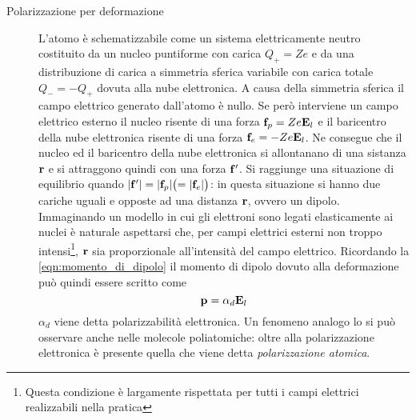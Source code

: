 \begin{description}
    \item[Polarizzazione per deformazione]
        L'atomo è schematizzabile come un sistema elettricamente neutro costituito da un nucleo puntiforme con carica $Q_+=Ze$
        e da una distribuzione di carica a simmetria sferica variabile con carica totale $Q_-=-Q_+$ dovuta alla nube elettronica.
        A causa della simmetria sferica
        il campo elettrico generato dall'atomo è nullo. Se però interviene un campo elettrico esterno
        il nucleo risente di una forza $\vb{f}_p=Ze\vb{E}_{l}$ e il baricentro della nube elettronica risente di una forza $\vb{f}_e=-Ze\vb{E}_{l}$.
        Ne consegue che il nucleo ed il baricentro della nube elettronica
        si allontanano di una sistanza $\vb{r}$ e si attraggono quindi con una forza $\vb{f'}$.
        Si raggiunge una situazione di equilibrio quando $\abs{\vb{f'}}=\abs{\vb{f}_p}\bigl(=\abs{\vb{f}_e}\bigr)$: in questa situazione si hanno due
        cariche uguali e opposte ad una distanza $\vb{r}$, ovvero un dipolo.
        Immaginando un modello in cui gli elettroni sono legati elasticamente ai nuclei è naturale aspettarsi che,
        per campi elettrici esterni non troppo intensi\footnote{Questa condizione è largamente rispettata
        per tutti i campi elettrici realizzabili nella pratica},
        $\vb{r}$ sia proporzionale all'intensità del campo elettrico.
        Ricordando la \eqref{eqn:momento_di_dipolo} il momento di dipolo dovuto alla deformazione può quindi essere scritto come
        \[
            \vb{p}=\alpha_d\vb{E}_{l}
        \]
        $\alpha_d$ viene detta polarizzabilità elettronica.
        Un fenomeno analogo lo si può osservare anche nelle molecole poliatomiche:
        oltre alla polarizzazione elettronica è presente quella che viene detta \textit{polarizzazione atomica}.


\end{description}
